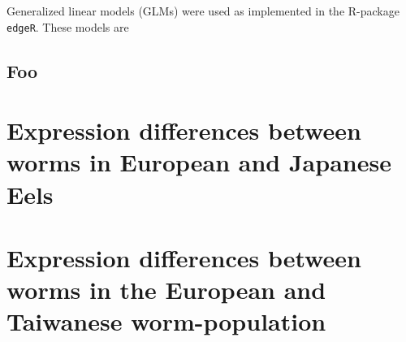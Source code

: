 Generalized linear models (GLMs) were used as implemented in the
R-package \texttt{edgeR}. These models are 

\subsection{Foo}

\section{Expression differences between worms in European and Japanese
  Eels}



\section{Expression differences between worms in the European and
  Taiwanese worm-population}






